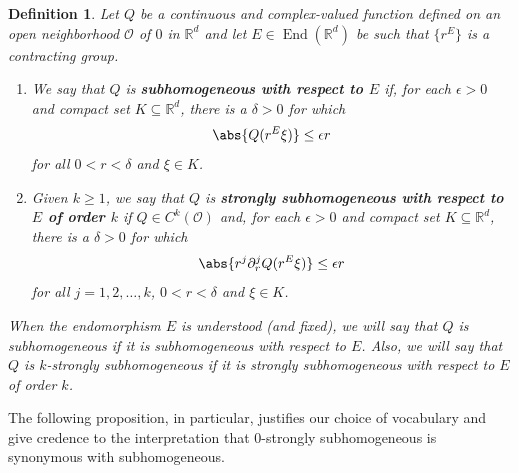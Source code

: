 \documentclass[11pt, letter]{book}
\newtheorem{definition}[theorem]{Definition}
\newcommand\End{\operatorname{End}} %
\begin{document}
\begin{framed}
\begin{definition}\label{def:homogeneous_types}
Let $Q$ be a continuous and complex-valued function defined on an open neighborhood $\mathcal{O}$ of $0$ in $\mathbb{R}^d$ and let $E\in\End(\mathbb{R}^d)$ be such that $\{r^E\}$ is a contracting group.
\begin{enumerate}
\item We say that $Q$ is \textbf{subhomogeneous with respect to $E$} if, for each $\epsilon>0$ and compact set $K\subseteq\mathbb{R}^d$, there is a $\delta>0$ for which
\begin{equation*}
\abs{Q(r^E\xi)}\leq \epsilon r
\end{equation*}
for all $0<r<\delta$ and $\xi\in K$.
\item Given $k\geq 1$, we say that $Q$ is \textbf{strongly subhomogeneous with respect to $E$ of order $k$} if $Q\in C^k(\mathcal{O})$ and, for each $\epsilon>0$ and compact set $K\subseteq\mathbb{R}^d$, there is a $\delta>0$ for which
\begin{equation*}
    \abs{r^j\partial_r^j Q(r^E\xi)}\leq \epsilon r
\end{equation*}
for all $j=1,2,\dots,k$, $0<r<\delta$ and $\xi\in K$.
\end{enumerate}
When the endomorphism $E$ is understood (and fixed), we will say that $Q$ is subhomogeneous if it is subhomogeneous with respect to $E$. Also, we will say that $Q$ is $k$-strongly subhomogeneous if it is strongly subhomogeneous with respect to $E$ of order $k$.
\end{definition}
\end{framed}
\noindent The following proposition, in particular, justifies our choice of vocabulary and give credence to the interpretation that $0$-strongly subhomogeneous is synonymous with subhomogeneous.
\end{document}
